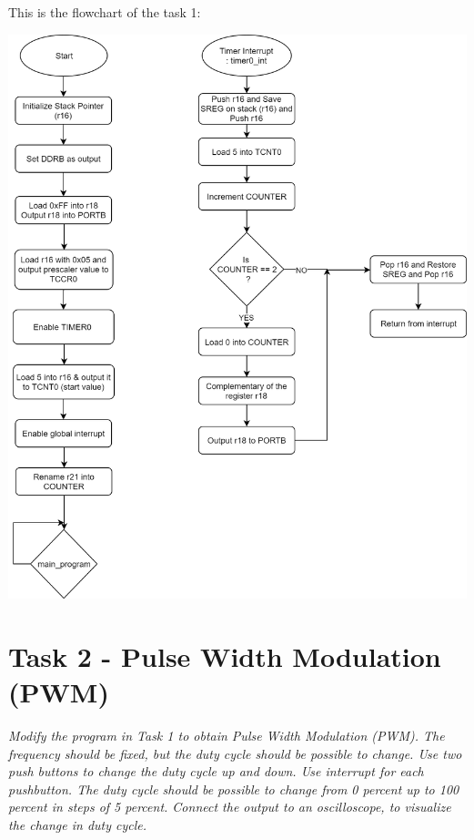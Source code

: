 \documentclass[a4paper,12pt]{article}
\begin{document}
\newpage
This is the flowchart of the task 1:
\begin{center}
\includegraphics[scale=1]{img/Task1.png}
\end{center}
\newpage
\section{Task 2 - Pulse Width Modulation (PWM)}
\textit{Modify the program in Task 1 to obtain Pulse Width Modulation (PWM). The frequency should be
fixed, but the duty cycle should be possible to change. Use two push buttons to change the duty
cycle up and down. Use interrupt for each pushbutton. The duty cycle should be possible to
change from 0 percent up to 100 percent in steps of 5 percent. Connect the output to an oscilloscope, to visualize
the change in duty cycle.}
\end{document}
